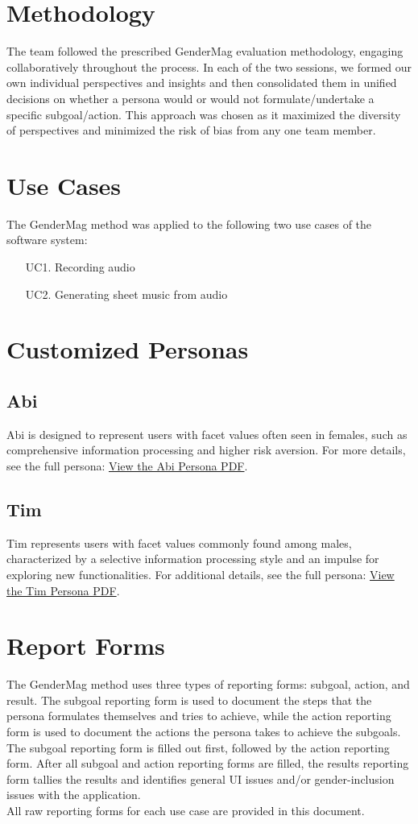 \documentclass[12pt, titlepage]{article}
\begin{document}
\section{Methodology}
The team followed the prescribed GenderMag evaluation methodology, engaging collaboratively throughout the process. 
In each of the two sessions, we formed our own individual perspectives and insights and then consolidated them in 
unified decisions on whether a persona would or would not formulate/undertake a specific subgoal/action. This approach 
was chosen as it maximized the diversity of perspectives and minimized the risk of bias from any one team member.

\section{Use Cases}
The GenderMag method was applied to the following two use cases of the software system:
\begin{enumerate}
    \item[UC1.] Recording audio
    \item[UC2.] Generating sheet music from audio
\end{enumerate}

\section{Customized Personas}
\subsection{Abi}
Abi is designed to represent users with facet values often seen in females, such as comprehensive 
information processing and higher risk aversion. For more details, see the full persona:
\href{Personas/abi.pdf}{View the Abi Persona PDF}.

\subsection{Tim}
Tim represents users with facet values commonly found among males, characterized by a selective 
information processing style and an impulse for exploring new functionalities. For additional 
details, see the full persona:
\href{Personas/tim.pdf}{View the Tim Persona PDF}.

\section{Report Forms}
The GenderMag method uses three types of reporting forms: subgoal, action, and result. The subgoal reporting
form is used to document the steps that the persona formulates themselves and tries to achieve, while the action
reporting form is used to document the actions the persona takes to achieve the subgoals. The
subgoal reporting form is filled out first, followed by the action reporting form. After all subgoal and action 
reporting forms are filled, the results reporting form tallies the results and identifies general UI issues and/or 
gender-inclusion issues with the application.\\
All raw reporting forms for each use case are provided in this document.
\end{document}
